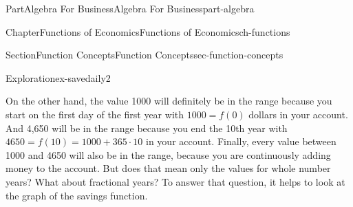 \documentclass[oneside,10pt,]{tufte-book}
\numberwithin{equation}{chapter}
\begin{document}
\begin{partptx}{Part}{Algebra For Business}{}{Algebra For Business}{}{}{part-algebra}
\begin{chapterptx}{Chapter}{Functions of Economics}{}{Functions of Economics}{}{}{ch-functions}
\begin{sectionptx}{Section}{Function Concepts}{}{Function Concepts}{}{}{sec-function-concepts}
\begin{exploration}{Exploration}{}{ex-savedaily2}
\begin{enumerate}[font=\bfseries,label=(\alph*),ref=\alph*]
\par
On the other hand, the value \textdollar{}1000 will definitely be in the range because you start on the first day of the first year with \(1000=f(0)\) dollars in your account. And  \textdollar{}4,650 will be in the range because you end the 10th year with \(4650=f(10)=1000+365\cdot 10\) in your account. Finally, every value between 1000 and 4650 will also be in the range, because you are continuously adding money to the account. But does that mean only the values for whole number years?  What about fractional years?   To answer that question, it helps to look at the graph of the savings function.%
\begin{image}{0}{1}{0}{}%
\end{image}
\end{enumerate}
\end{exploration}
\end{sectionptx}
\end{chapterptx}
\end{partptx}
\end{document}
